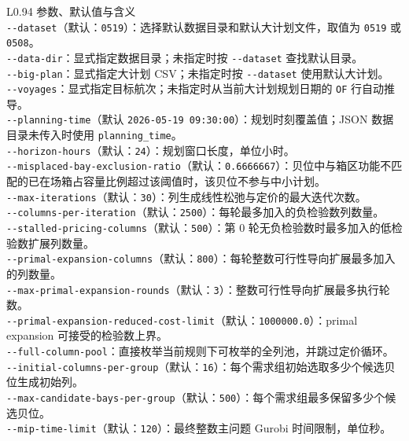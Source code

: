 \documentclass[UTF8,a4paper,11pt]{ctexart}
\newcommand{\code}[1]{\nolinkurl{#1}}
\begin{document}
\begin{longtable}{L{0.94\linewidth}}
\toprule
参数、默认值与含义\\
\midrule
\code{--dataset}（默认：\code{0519}）：选择默认数据目录和默认大计划文件，取值为 \code{0519} 或 \code{0508}。\\[0.25em]
\code{--data-dir}：显式指定数据目录；未指定时按 \code{--dataset} 查找默认目录。\\[0.25em]
\code{--big-plan}：显式指定大计划 CSV；未指定时按 \code{--dataset} 使用默认大计划。\\[0.25em]
\code{--voyages}：显式指定目标航次；未指定时从当前大计划规划日期的 \code{OF} 行自动推导。\\[0.25em]
\code{--planning-time}（默认 \code{2026-05-19 09:30:00}）：规划时刻覆盖值；JSON 数据目录未传入时使用 \code{planning_time}。\\[0.25em]
\code{--horizon-hours}（默认：\code{24}）：规划窗口长度，单位小时。\\[0.25em]
\code{--misplaced-bay-exclusion-ratio}（默认：\code{0.6666667}）：贝位中与箱区功能不匹配的已在场箱占容量比例超过该阈值时，该贝位不参与中小计划。\\[0.25em]
\code{--max-iterations}（默认：\code{30}）：列生成线性松弛与定价的最大迭代次数。\\[0.25em]
\code{--columns-per-iteration}（默认：\code{2500}）：每轮最多加入的负检验数列数量。\\[0.25em]
\code{--stalled-pricing-columns}（默认：\code{500}）：第 0 轮无负检验数时最多加入的低检验数扩展列数量。\\[0.25em]
\code{--primal-expansion-columns}（默认：\code{800}）：每轮整数可行性导向扩展最多加入的列数量。\\[0.25em]
\code{--max-primal-expansion-rounds}（默认：\code{3}）：整数可行性导向扩展最多执行轮数。\\[0.25em]
\code{--primal-expansion-reduced-cost-limit}（默认：\code{1000000.0}）：primal expansion 可接受的检验数上界。\\[0.25em]
\code{--full-column-pool}：直接枚举当前规则下可枚举的全列池，并跳过定价循环。\\[0.25em]
\code{--initial-columns-per-group}（默认：\code{16}）：每个需求组初始选取多少个候选贝位生成初始列。\\[0.25em]
\code{--max-candidate-bays-per-group}（默认：\code{500}）：每个需求组最多保留多少个候选贝位。\\[0.25em]
\code{--mip-time-limit}（默认：\code{120}）：最终整数主问题 Gurobi 时间限制，单位秒。\\[0.25em]

\end{longtable}
\end{document}
